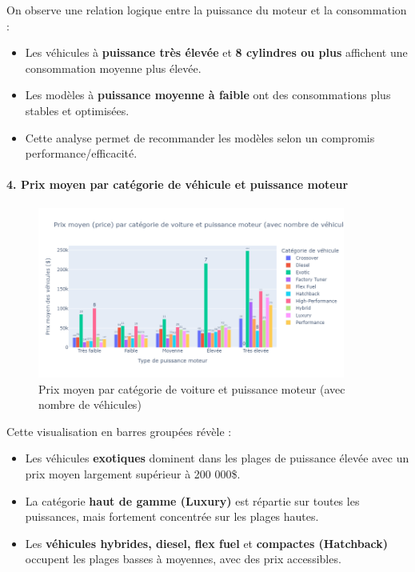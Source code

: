 \documentclass[12pt]{report}
\begin{document}
On observe une relation logique entre la puissance du moteur et la consommation :
\begin{itemize}
  \item Les véhicules à \textbf{puissance très élevée} et \textbf{8 cylindres ou plus} affichent une consommation moyenne plus élevée.
  \item Les modèles à \textbf{puissance moyenne à faible} ont des consommations plus stables et optimisées.
  \item Cette analyse permet de recommander les modèles selon un compromis performance/efficacité.
\end{itemize}

\paragraph{4. Prix moyen par catégorie de véhicule et puissance moteur}\mbox{}

\begin{figure}[H]
\centering
\includegraphics[width=0.9\textwidth]{price_vs_hp_market.png}
\caption{Prix moyen par catégorie de voiture et puissance moteur (avec nombre de véhicules)}
\end{figure}

Cette visualisation en barres groupées révèle :
\begin{itemize}
  \item Les véhicules \textbf{exotiques} dominent dans les plages de puissance élevée avec un prix moyen largement supérieur à 200 000\$.
  \item La catégorie \textbf{haut de gamme (Luxury)} est répartie sur toutes les puissances, mais fortement concentrée sur les plages hautes.
  \item Les \textbf{véhicules hybrides, diesel, flex fuel} et \textbf{compactes (Hatchback)} occupent les plages basses à moyennes, avec des prix accessibles.
\end{itemize}
\end{document}
